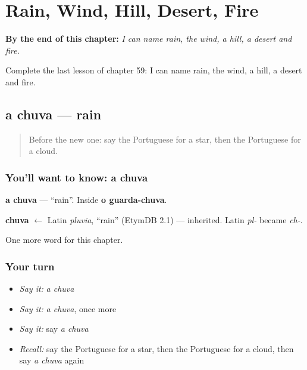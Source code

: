 
\chapter{Rain, Wind, Hill, Desert, Fire}
\label{ch:pt-rain-wind-hill-desert-fire}

\begin{chapteropening}
\textbf{By the end of this chapter:} \emph{I can name rain, the wind, a hill, a desert and fire.}

Complete the last lesson of chapter 59: I can name rain, the wind, a hill, a desert and fire.
\end{chapteropening}

\section[a chuva]{a chuva — rain}

\label{lesson:PT-C59-chuva}



\begin{quote}
Before the new one: say the Portuguese for a star, then the Portuguese for a cloud.
\end{quote}

\subsection*{You'll want to know: a chuva}
\textbf{a chuva} — \textquotedblleft{}rain\textquotedblright{}. Inside \textbf{o guarda-chuva}.

\begin{cousinweb}
\textbf{chuva} $\leftarrow$ Latin \emph{pluvia}, \textquotedblleft{}rain\textquotedblright{} (EtymDB 2.1) — inherited. Latin \emph{pl-} became \emph{ch-}.
\end{cousinweb}

\begin{grammarlens}[title={What you've built}]
One more word for this chapter.
\end{grammarlens}

\subsection*{Your turn}
\begin{itemize}
\raggedright
  \item \emph{Say it:} \emph{a chuva}
  \item \emph{Say it:} \emph{a chuva}, once more
  \item \emph{Say it:} say \emph{a chuva}
  \item \emph{Recall:} say the Portuguese for a star, then the Portuguese for a cloud, then say \emph{a chuva} again
\end{itemize}

